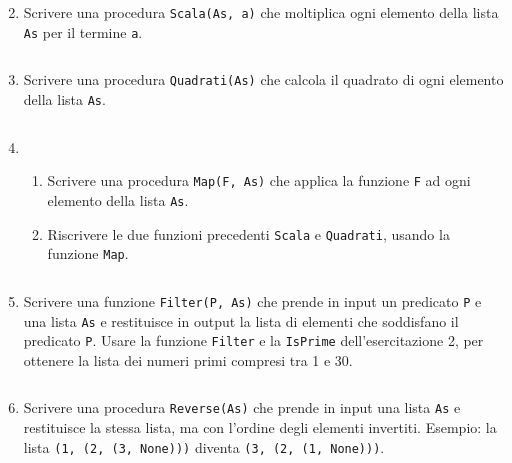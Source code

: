 \documentclass[11pt,a4]{article}
\newcommand{\mybox}[2]{$\quad$\fbox{
\begin{minipage}{#1cm}
\hfill\vspace{#2cm}
\end{minipage}
}}
\begin{document}
\begin{enumerate}
\mybox{15}{2.0}

\item Scrivere una procedura {\tt Scala(As, a)} che moltiplica ogni elemento della lista {\tt As} per il termine {\tt a}.

\mybox{15}{1.5}

\item Scrivere una procedura {\tt Quadrati(As)} che calcola il quadrato di ogni elemento della lista {\tt As}.

\mybox{15}{1.5}

\item 
\begin{enumerate}
\item Scrivere una procedura {\tt Map(F, As)} che applica la funzione {\tt F} ad ogni elemento della lista {\tt As}.
\item Riscrivere le due funzioni precedenti {\tt Scala} e {\tt Quadrati}, usando la funzione {\tt Map}.
\end{enumerate}

\mybox{15}{2.0}

\item Scrivere una funzione {\tt Filter(P, As)} che prende in input un predicato {\tt P} e una lista {\tt As}
e restituisce in output la lista di elementi che soddisfano il predicato {\tt P}. Usare la funzione {\tt Filter}
e la {\tt IsPrime} dell'esercitazione 2, per ottenere la lista dei numeri primi compresi tra 1 e 30.


\mybox{15}{2.5}

\item Scrivere una procedura {\tt Reverse(As)} che prende in input una lista {\tt As} e restituisce la stessa lista, ma con l'ordine degli elementi invertiti. 
Esempio: la lista {\tt (1, (2, (3, None)))} diventa {\tt (3, (2, (1, None)))}.

\mybox{15}{2.5}
\end{enumerate}
\end{document}
